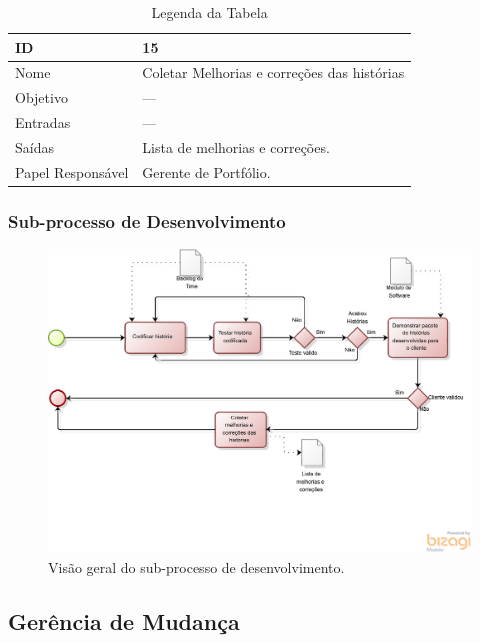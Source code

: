   \begin{table}[H]
    \centering
      \begin{tabular}{| m{5em} | m{10cm} |}
        \hline
        ID       & 15   \\ \hline
        Nome     & Coletar Melhorias e correções das histórias  \\ \hline
        Objetivo & ---  \\ \hline
        Entradas & ---\\ \hline
        Saídas   & Lista de melhorias e correções. \\ \hline
        Papel Responsável   & Gerente de Portfólio. \\ \hline
      \end{tabular}
      \caption{Legenda da Tabela}
      \label{tabela:atividade15}
  \end{table}

  \subsubsection{Sub-processo de Desenvolvimento}
    \begin{figure}[H]
        \centering
      \includegraphics[keepaspectratio=true,scale=0.6]{figuras/desenvolves.eps}
        \caption{Visão geral do sub-processo de desenvolvimento.}
        \label{fig:gerencia}
    \end{figure}

\subsection{Gerência de Mudança}\label{sec:gerencia}

